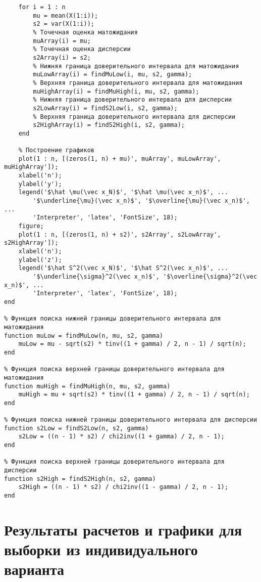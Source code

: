 \documentclass[a4paper,oneside,12pt]{extreport}
\theoremstyle{indented}
\begin{document}
\begin{lstlisting}[caption=Реализация]
    % Цикл от 1 до n
    for i = 1 : n
        mu = mean(X(1:i));
        s2 = var(X(1:i));
        % Точечная оценка матожидания
        muArray(i) = mu;
        % Точечная оценка дисперсии
        s2Array(i) = s2;
        % Нижняя граница доверительного интервала для матожидания
        muLowArray(i) = findMuLow(i, mu, s2, gamma);
        % Верхняя граница доверительного интервала для матожидания
        muHighArray(i) = findMuHigh(i, mu, s2, gamma);
        % Нижняя граница доверительного интервала для дисперсии
        s2LowArray(i) = findS2Low(i, s2, gamma);
        % Верхняя граница доверительного интервала для дисперсии
        s2HighArray(i) = findS2High(i, s2, gamma);
    end
    
    % Построение графиков
    plot(1 : n, [(zeros(1, n) + mu)', muArray', muLowArray', muHighArray']);
    xlabel('n');
    ylabel('y');
    legend('$\hat \mu(\vec x_N)$', '$\hat \mu(\vec x_n)$', ...
        '$\underline{\mu}(\vec x_n)$', '$\overline{\mu}(\vec x_n)$', ...
        'Interpreter', 'latex', 'FontSize', 18);
    figure;
    plot(1 : n, [(zeros(1, n) + s2)', s2Array', s2LowArray', s2HighArray']);
    xlabel('n');
    ylabel('z');
    legend('$\hat S^2(\vec x_N)$', '$\hat S^2(\vec x_n)$', ...
        '$\underline{\sigma}^2(\vec x_n)$', '$\overline{\sigma}^2(\vec x_n)$', ...
        'Interpreter', 'latex', 'FontSize', 18);
end

% Функция поиска нижней границы доверительного интервала для матожидания
function muLow = findMuLow(n, mu, s2, gamma)
    muLow = mu - sqrt(s2) * tinv((1 + gamma) / 2, n - 1) / sqrt(n);
end

% Функция поиска верхней границы доверительного интервала для матожидания
function muHigh = findMuHigh(n, mu, s2, gamma)
    muHigh = mu + sqrt(s2) * tinv((1 + gamma) / 2, n - 1) / sqrt(n);
end

% Функция поиска нижней границы доверительного интервала для дисперсии
function s2Low = findS2Low(n, s2, gamma)
    s2Low = ((n - 1) * s2) / chi2inv((1 + gamma) / 2, n - 1);
end

% Функция поиска верхней границы доверительного интервала для дисперсии
function s2High = findS2High(n, s2, gamma)
    s2High = ((n - 1) * s2) / chi2inv((1 - gamma) / 2, n - 1);
end
\end{lstlisting}

\section{Результаты расчетов и графики для выборки из индивидуального варианта} 
\end{document}
